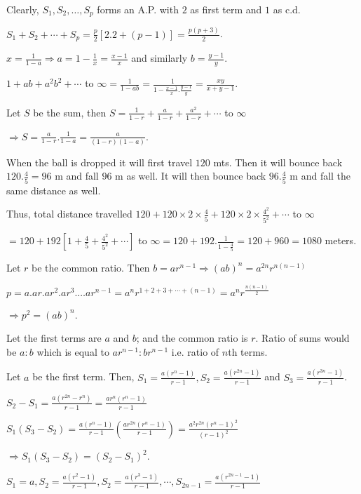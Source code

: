   Clearly, $S_1, S_2, \ldots, S_p$ forms an A.P. with $2$ as first term and $1$ as c.d.

  $S_1 + S_2 + \cdots + S_p = \frac{p}{2}[2.2 + (p - 1)] = \frac{p(p + 3)}{2}$.
\item $x = \frac{1}{1 - a} \Rightarrow a = 1 - \frac{1}{x} = \frac{x - 1}{x}$ and similarly $b = \frac{y -
  1}{y}$.

  $1 + ab + a^2b^2 + \cdots$ to $\infty = \frac{1}{1 - ab} = \frac{1}{1 - \frac{x - 1}{x}.\frac{y - 1}{y}} =
  \frac{xy}{x + y - 1}$.
\item Let $S$ be the sum, then $S = \frac{1}{1 - r} + \frac{a}{1 - r} + \frac{a^2}{1 - r} + \cdots$ to
  $\infty$

  $\Rightarrow S = \frac{a}{1 - r}.\frac{1}{1 - a} = \frac{a}{(1 - r)(1 - a)}$.
\item When the ball is dropped it will first travel $120$ mts. Then it will bounce back $120.\frac{4}{5} =
  96$ m and fall $96$ m as well. It will then bounce back $96.\frac{4}{5}$ m and fall the same distance as
  well.

  Thus, total distance travelled $120 + 120\times2\times\frac{4}{5} + 120\times2\times\frac{4^2}{5^2} +
  \cdots$ to $\infty$

  $= 120 + 192 \left[1 + \frac{4}{5} + \frac{4^2}{5^2} + \cdots\right]$ to $\infty = 120 + 192.\frac{1}{1 -
    \frac{4}{5}} = 120 + 960 = 1080$ meters.
\item Let $r$ be the common ratio. Then $b = ar^{n - 1} \Rightarrow (ab)^n = a^{2n}r^{n(n - 1)}$

  $p = a.ar.ar^2.ar^3.\ldots ar^{n - 1} = a^nr^{1 + 2 + 3 + \cdots + (n - 1)} = a^nr^{\tfrac{n(n - 1)}{2}}$

  $\Rightarrow p^2 = (ab)^n$.
\item Let the first terms are $a$ and $b$; and the common ratio is $r$. Ratio of sums would be $a:b$ which
  is equal to $ar^{n -1}:br^{n -1}$ i.e. ratio of $n$th terms.
\item Let $a$ be the first term. Then, $S_1 = \frac{a(r^n - 1)}{r - 1}, S_2 = \frac{a(r^{2n} - 1)}{r - 1}$
  and $S_3 = \frac{a(r^{3n} - 1)}{r - 1}$.

  $S_2 - S_1 = \frac{a(r^{2n} - r^n)}{r - 1} = \frac{ar^n(r^n - 1)}{r - 1}$

  $S_1(S_3 - S_2) = \frac{a(r^n - 1)}{r - 1}\left(\frac{ar^{2n}(r^n - 1)}{r - 1}\right) =
  \frac{a^2r^{2n}(r^n - 1)^2}{(r - 1)^2}$

  $\Rightarrow S_1(S_3 - S_2) = (S_2 - S_1)^2$.
\item $S_1 = a, S_2 = \frac{a(r^2 - 1)}{r - 1}, S_2 = \frac{a(r^3 - 1)}{r - 1}, \cdots, S_{2n - 1} =
  \frac{a(r^{2n - 1} - 1)}{r - 1}$

